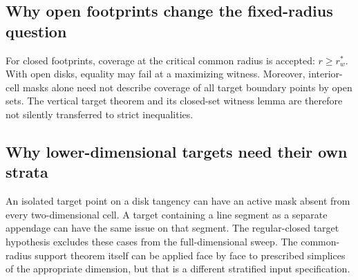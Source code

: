 \subsection{Why open footprints change the fixed-radius question}
For closed footprints, coverage at the critical common radius is accepted: $r\ge r_w^*$. With open disks, equality may fail at a maximizing witness. Moreover, interior-cell masks alone need not describe coverage of all target boundary points by open sets. The vertical target theorem and its closed-set witness lemma are therefore not silently transferred to strict inequalities.

\subsection{Why lower-dimensional targets need their own strata}
An isolated target point on a disk tangency can have an active mask absent from every two-dimensional cell. A target containing a line segment as a separate appendage can have the same issue on that segment. The regular-closed target hypothesis excludes these cases from the full-dimensional sweep. The common-radius support theorem itself can be applied face by face to prescribed simplices of the appropriate dimension, but that is a different stratified input specification.
